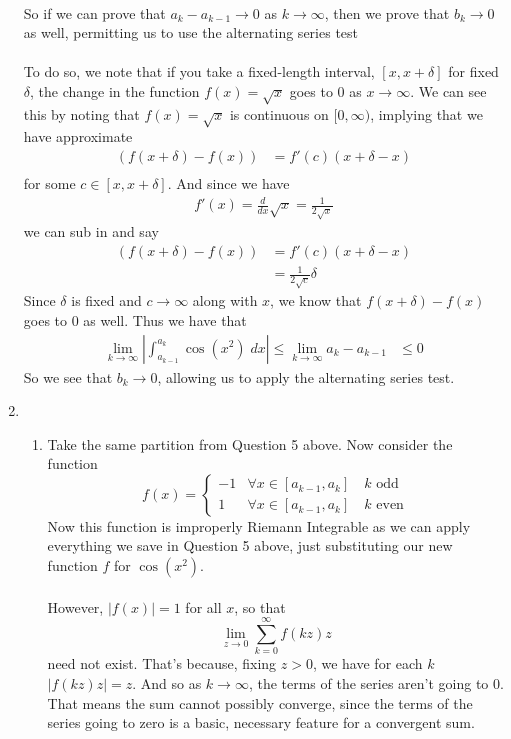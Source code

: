 \documentclass[12pt]{article}
\theoremstyle{plain}
\theoremstyle{definition}
\theoremstyle{remark}
\begin{document}
\begin{enumerate}
\begin{align*}
\end{align*}
So if we can prove that $a_k - a_{k-1} \rightarrow 0$ as $k\rightarrow \infty$, then we prove that $b_k\rightarrow0$ as well, permitting us to use the alternating series test
\\
\\
To do so, we note that if you take a fixed-length interval, $[x,x+\delta]$ for fixed $\delta$, the change in the function $f(x) = \sqrt{x}$ goes to 0 as $x\rightarrow\infty$. We can see this by noting that $f(x) = \sqrt{x}$ is continuous on $[0, \infty)$, implying that we have approximate
\begin{align*}
    (f(x+\delta) - f(x)) &= f'(c)(x+\delta - x)\\
\end{align*}
for some $c\in[x, x+\delta]$. And since we have
\begin{align*}
    f'(x) = \frac{d}{dx} \sqrt{x} = \frac{1}{2\sqrt{x}}
\end{align*}
we can sub in and say
\begin{align*}
    (f(x+\delta) - f(x)) &= f'(c)(x+\delta - x)\\
    &= \frac{1}{2\sqrt{c}} \delta
\end{align*}
Since $\delta$ is fixed and $c\rightarrow\infty$ along with $x$, we know that $f(x+\delta) - f(x)$ goes to 0 as well. Thus we have that
\begin{align*}
    \lim_{k\rightarrow\infty}\left\lvert \int^{a_k}_{a_{k-1}} \cos(x^2) \; dx \right\rvert \leq 
     \lim_{k\rightarrow\infty}   a_k - a_{k-1} 
        &\leq 0
\end{align*}
So we see that $b_k\rightarrow 0$, allowing us to apply the alternating series test.


\newpage
\item 
\begin{enumerate}

\item Take the same partition from Question 5 above.  Now consider the function 
    \[ f(x) = \begin{cases} -1 & \forall x \in [a_{k-1}, a_k] \quad \text{$k$ odd} \\
                             1 & \forall x \in [a_{k-1}, a_k] \quad \text{$k$ even} 
                \end{cases} \]
Now this function is improperly Riemann Integrable as we can apply everything we save in Question 5 above, just substituting our new function $f$ for $\cos(x^2)$.
\\
\\
However, $|f(x)| = 1$ for all $x$, so that 
    \[ \lim_{z\rightarrow 0} \sum^\infty_{k=0} f(kz) z \]
need not exist. That's because, fixing $z>0$, we have for each $k$ $|f(kz)z| = z$. And so as $k\rightarrow\infty$, the terms of the series aren't going to 0. That means the sum cannot possibly converge, since the terms of the series going to zero is a basic, necessary feature for a convergent sum.


\end{enumerate}
\end{enumerate}
\end{document}

